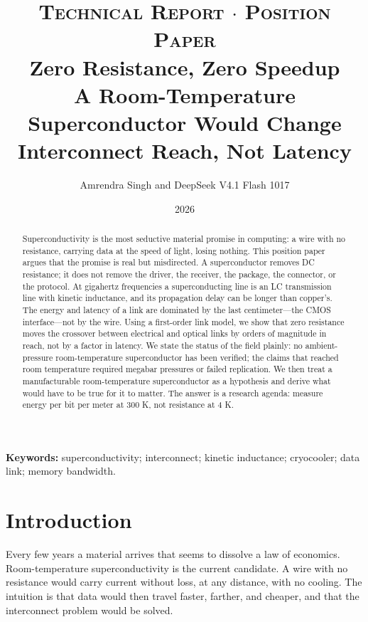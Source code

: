 \documentclass[10pt,letterpaper]{article}
\begin{document}
\title{\textsc{\small Technical Report $\cdot$ Position Paper}\\[10pt]
\textbf{Zero Resistance, Zero Speedup}\\[5pt]
{\large A Room-Temperature Superconductor Would Change Interconnect Reach, Not Latency}}
\author{\normalsize Amrendra Singh and DeepSeek V4.1 Flash 1017}
\date{\normalsize 2026}
\maketitle
\vspace{-1.4em}

\begin{abstract}
\noindent Superconductivity is the most seductive material promise in computing: a wire with no resistance, carrying data at the speed of light, losing nothing. This position paper argues that the promise is real but misdirected. A superconductor removes DC resistance; it does not remove the driver, the receiver, the package, the connector, or the protocol. At gigahertz frequencies a superconducting line is an LC transmission line with kinetic inductance, and its propagation delay can be longer than copper's. The energy and latency of a link are dominated by the last centimeter---the CMOS interface---not by the wire. Using a first-order link model, we show that zero resistance moves the crossover between electrical and optical links by orders of magnitude in reach, not by a factor in latency. We state the status of the field plainly: no ambient-pressure room-temperature superconductor has been verified; the claims that reached room temperature required megabar pressures or failed replication. We then treat a manufacturable room-temperature superconductor as a hypothesis and derive what would have to be true for it to matter. The answer is a research agenda: measure energy per bit per meter at 300 K, not resistance at 4 K.
\end{abstract}

\noindent\textbf{Keywords:} superconductivity; interconnect; kinetic inductance; cryocooler; data link; memory bandwidth.

\section{Introduction}
\label{sec:intro}

Every few years a material arrives that seems to dissolve a law of economics. Room-temperature superconductivity is the current candidate. A wire with no resistance would carry current without loss, at any distance, with no cooling. The intuition is that data would then travel faster, farther, and cheaper, and that the interconnect problem would be solved.
\end{document}
